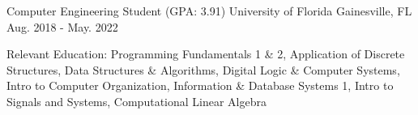\begin{cventries}
  \cventry
	{Computer Engineering Student (GPA: 3.91)}
	{University of Florida}
	{Gainesville, FL}
	{Aug. 2018 - May. 2022}
	{
		\begin{cvitems}
			\item {Relevant Education: Programming Fundamentals 1 \& 2, Application of Discrete Structures, Data Structures \& Algorithms, Digital Logic \& Computer Systems, Intro to Computer Organization, Information \& Database Systems 1, Intro to Signals and Systems, Computational Linear Algebra }
		\end{cvitems}
	}
\end{cventries}
